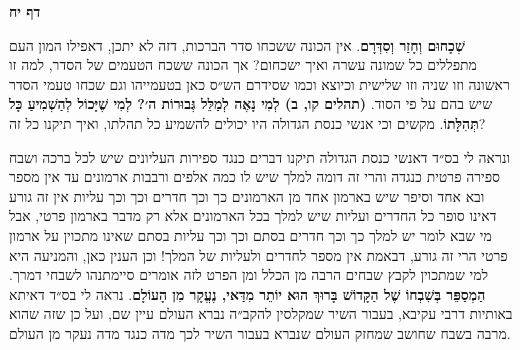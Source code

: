 \documentclass[12pt, openany]{book}
\newcommand{\sethebfont}{
\fontsize{10.5pt}{13.1pt} \selectfont
}
\newcommand{\twocol}[1]{
	{\sethebfont \begin{multicols}{2}
			#1
	\end{multicols}}	
}
\newcommand{\sectname}{}
\newcommand{\newsection}[1]{
	\renewcommand{\sectname}{#1}	
	\vspace{-\baselineskip}
	\begin{center}
		\textbf{%
\fontsize{16pt}{16pt}\selectfont
			#1}
	\end{center}
	\vspace{-\baselineskip}
	\nopagebreak
}
\begin{document}
\newsection{דף יח}
\twocol{\textbf{שְׁכָחוּם וְחָזַר וְסִדְּרָם}. אין הכונה ששכחו סדר הברכות, דזה לא יתכן, דאפילו המון העם מתפללים כל שמונה עשרה ואיך ישכחום? אך הכונה ששכח הטעמים של הסדר, למה זו ראשונה וזו שניה וזו שלישית וכיוצא וכמו שסידרם הש״ס כאן בטעמייהו וגם שכחו טעמי הסדר שיש בהם על פי הסוד.
\textbf{{\small (תהלים קו, ב)} לְמִי נָאֶה לְמַלֵּל גְּבוּרוֹת ה׳? לְמִי שֶׁיָּכוֹל לְהַשְׁמִיעַ כָּל תְּהִלָּתוֹ}. מקשים וכי אנשי כנסת הגדולה היו יכולים להשמיע כל תהלתו, ואיך תיקנו כל זה?\par ונראה לי בס״ד דאנשי כנסת הגדולה תיקנו דברים כנגד ספירות העליונים שיש לכל ברכה ושבח ספירה פרטית כנגדה והרי זה דומה למלך שיש לו כמה אלפים ורבבות ארמונים עד אין מספר ובא אחד וסיפר שיש בארמון אחד מן הארמונים כך וכך חדרים וכך וכך עליות אין זה גורע דאינו סופר כל החדרים ועליות שיש למלך בכל הארמונים אלא רק מדבר בארמון פרטי, אבל מי שבא לומר יש למלך כך וכך חדרים בסתם וכך וכך עליות בסתם שאינו מתכוין על ארמון פרטי הרי זה גורע, דבאמת אין מספר לחדרים ולעליות של המלך! וכן הענין כאן, והמניעה היא למי שמתכוין לקבץ שבחים הרבה מן הכלל ומן הפרט לזה אומרים סיימתנהו לשבחי דמרך.
\textbf{הַמְסַפֵּר בְּשִׁבְחוֹ שֶׁל הַקָּדוֹשׁ בָּרוּךְ הוּא יוֹתֵר מִדַּאי, נֶעֱקָר מִן הָעוֹלָם}. נראה לי בס״ד דאיתא באותיות דרבי עקיבא, בעבור השיר שמקלסין להקב״ה נברא העולם עיין שם, ועל כן שזה שהוא מרבה בשבח שחושב שמחזק העולם שנברא בעבור השיר לכך מדה כנגד מדה נעקר מן העולם.
}
\end{document}
